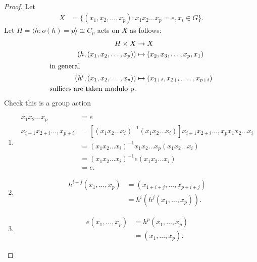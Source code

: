 \begin{proof}
    Let
    \begin{align*}
        X &= \{ (x_1, x_2, \ldots, x_p) : x_1 x_2 \ldots x_p = e, x_i \in G \}.
    \end{align*} 
    Let $H = \langle h : o(h) = p \rangle \cong C_p$ acts on $X$ as follows:
    \begin{align*}
        H \times X &\to X \\
        (h, (x_1, x_2, \ldots, x_p)) &\mapsto (x_2, x_3, \ldots, x_p, x_1) \\
        \intertext{in general}
        (h^i, (x_1, x_2, \ldots, x_p)) &\mapsto (x_{1 + i}, x_{2 + i}, \ldots, x_{p + i}) \\
        \text{suffices are taken modulo p.}
    \end{align*}
    Check this is a group action
    \begin{enumerate} \addtocounter{enumi}{-1}
        \item \begin{align*}
            x_1 x_2 \ldots x_p &= e \\
            x_{i + 1} x_{2 + i} \ldots, x_{p + i} &= [(x_1 x_2 \ldots x_i)^{-1} (x_1 x_2 \ldots x_i)] x_{i + 1} x_{2 + i} \ldots, x_{p} x_1 x_2 \ldots x_i \\ 
            &= (x_1 x_2 \ldots x_i)^{-1} x_1 x_2 \ldots x_p (x_1 x_2 \ldots x_i) \\
            &= (x_1 x_2 \ldots x_i)^{-1} e (x_1 x_2 \ldots x_i) \\
            &= e.
        \end{align*} 
        \item \begin{align*}
            h^{i + j} (x_1, \ldots, x_p) &= (x_{1 + i + j}, \ldots, x_{p + i + j}) \\
            &= h^i (h^j (x_1, \ldots, x_p)).
        \end{align*} 
        \item \begin{align*}
            e (x_1, \ldots, x_p) &= h^p (x_1, \ldots, x_p) \\
            &= (x_1, \ldots, x_p).
        \end{align*} 
    \end{enumerate} 
\end{proof} 

